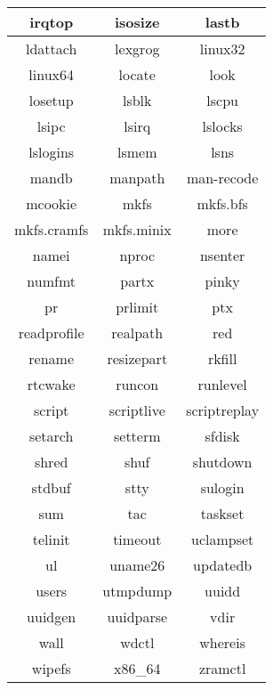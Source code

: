 \begin{center}
    \begin{tabular}{|c|c|c|}
        \hline
        irqtop & isosize & lastb \\
        \hline
        ldattach & lexgrog & linux32 \\
        \hline
        linux64 & locate & look \\
        \hline
        losetup & lsblk & lscpu \\
        \hline
        lsipc & lsirq & lslocks \\
        \hline
        lslogins & lsmem & lsns \\
        \hline
        mandb & manpath & man-recode \\
        \hline
        mcookie & mkfs & mkfs.bfs \\
        \hline
        mkfs.cramfs & mkfs.minix & more \\
        \hline
        namei & nproc & nsenter \\
        \hline
        numfmt & partx & pinky \\
        \hline
        pr & prlimit & ptx \\
        \hline
        readprofile & realpath & red \\
        \hline
        rename & resizepart & rkfill \\
        \hline
        rtcwake & runcon & runlevel \\
        \hline
        script & scriptlive & scriptreplay \\
        \hline
        setarch & setterm & sfdisk \\
        \hline
        shred & shuf & shutdown \\
        \hline
        stdbuf & stty & sulogin \\
        \hline
        sum & tac & taskset \\
        \hline
        telinit & timeout & uclampset \\
        \hline
        ul & uname26 & updatedb \\
        \hline
        users & utmpdump & uuidd \\
        \hline
        uuidgen & uuidparse & vdir \\
        \hline
        wall & wdctl & whereis \\
        \hline
        wipefs & x86\_64 & zramctl \\
        \hline
    \end{tabular}
\end{center}
